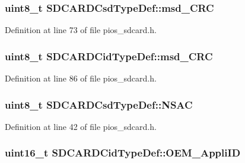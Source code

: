 \hypertarget{group___p_i_o_s___s_d_c_a_r_d_ga653812c0595db0ef3eddae3dbf409b87}{
\subsubsection[{msd\-\_\-\-C\-R\-C}]{\setlength{\rightskip}{0pt plus 5cm}uint8\-\_\-t {\bf \-S\-D\-C\-A\-R\-D\-Csd\-Type\-Def\-::msd\-\_\-\-C\-R\-C}}}\label{group___p_i_o_s___s_d_c_a_r_d_ga653812c0595db0ef3eddae3dbf409b87}


\-Definition at line 73 of file pios\-\_\-sdcard.\-h.

\hypertarget{group___p_i_o_s___s_d_c_a_r_d_gaeafc9f7dae979dcf639b88246bbe29b6}{
\subsubsection[{msd\-\_\-\-C\-R\-C}]{\setlength{\rightskip}{0pt plus 5cm}uint8\-\_\-t {\bf \-S\-D\-C\-A\-R\-D\-Cid\-Type\-Def\-::msd\-\_\-\-C\-R\-C}}}\label{group___p_i_o_s___s_d_c_a_r_d_gaeafc9f7dae979dcf639b88246bbe29b6}


\-Definition at line 86 of file pios\-\_\-sdcard.\-h.

\hypertarget{group___p_i_o_s___s_d_c_a_r_d_ga8573c74ea99da2cfb8f4848fa4350491}{
\subsubsection[{\-N\-S\-A\-C}]{\setlength{\rightskip}{0pt plus 5cm}uint8\-\_\-t {\bf \-S\-D\-C\-A\-R\-D\-Csd\-Type\-Def\-::\-N\-S\-A\-C}}}\label{group___p_i_o_s___s_d_c_a_r_d_ga8573c74ea99da2cfb8f4848fa4350491}


\-Definition at line 42 of file pios\-\_\-sdcard.\-h.

\hypertarget{group___p_i_o_s___s_d_c_a_r_d_gaba70fef7b702c2d5dc086c3cc997d4bc}{
\subsubsection[{\-O\-E\-M\-\_\-\-Appli\-I\-D}]{\setlength{\rightskip}{0pt plus 5cm}uint16\-\_\-t {\bf \-S\-D\-C\-A\-R\-D\-Cid\-Type\-Def\-::\-O\-E\-M\-\_\-\-Appli\-I\-D}}}\label{group___p_i_o_s___s_d_c_a_r_d_gaba70fef7b702c2d5dc086c3cc997d4bc}


